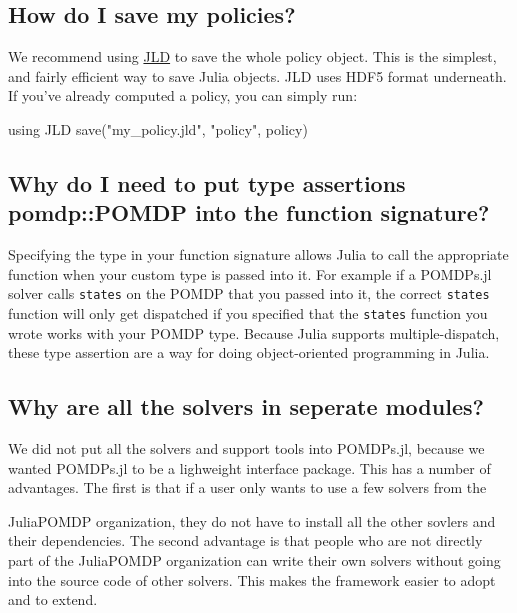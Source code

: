 \documentclass[12pt,]{article}
\newenvironment{Shaded}{}{}
\newcommand{\StringTok}[1]{\textcolor[rgb]{0.25,0.44,0.63}{{#1}}}
\newcommand{\NormalTok}[1]{{#1}}
\begin{document}
\subsection{How do I save my policies?}\label{how-do-i-save-my-policies}

We recommend using \href{https://github.com/JuliaIO/JLD.jl}{JLD} to save
the whole policy object. This is the simplest, and fairly efficient way
to save Julia objects. JLD uses HDF5 format underneath. If you've
already computed a policy, you can simply run:

\begin{Shaded}
\begin{Highlighting}[]
\NormalTok{using JLD}
\NormalTok{save(}\StringTok{"my_policy.jld"}\NormalTok{, }\StringTok{"policy"}\NormalTok{, policy) }
\end{Highlighting}
\end{Shaded}

\subsection{Why do I need to put type assertions pomdp::POMDP into the
function
signature?}\label{why-do-i-need-to-put-type-assertions-pomdppomdp-into-the-function-signature}

Specifying the type in your function signature allows Julia to call the
appropriate function when your custom type is passed into it. For
example if a POMDPs.jl solver calls \texttt{states} on the POMDP that
you passed into it, the correct \texttt{states} function will only get
dispatched if you specified that the \texttt{states} function you wrote
works with your POMDP type. Because Julia supports multiple-dispatch,
these type assertion are a way for doing object-oriented programming in
Julia.

\subsection{Why are all the solvers in seperate
modules?}\label{why-are-all-the-solvers-in-seperate-modules}

We did not put all the solvers and support tools into POMDPs.jl, because
we wanted POMDPs.jl to be a lighweight interface package. This has a
number of advantages. The first is that if a user only wants to use a
few solvers from the

JuliaPOMDP organization, they do not have to install all the other
sovlers and their dependencies. The second advantage is that people who
are not directly part of the JuliaPOMDP organization can write their own
solvers without going into the source code of other solvers. This makes
the framework easier to adopt and to extend.
\end{document}
